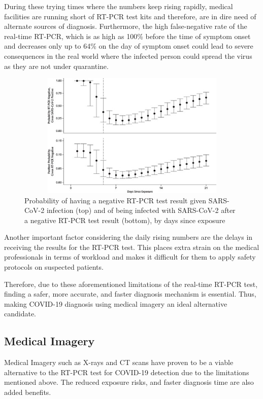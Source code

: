 During these trying times where the numbers keep rising rapidly, medical 
facilities are running short of RT-PCR test kits and therefore, are 
in dire need of alternate sources of diagnosis. Furthermore, 
the high false-negative rate of the real-time RT-PCR, 
which is as high as 100\% before the time of symptom onset 
and decreases only up to 64\% on the day of symptom onset \cite{KLL+2020} could 
lead to severe consequences in the real world where the 
infected person could spread the virus as they are not under quarantine.
\vspace{1em}
\begin{figure}[H]
    \centering
    \includegraphics[width=15cm, height=6cm]{Images/RTPCR.jpg}
    \decoRule
    \caption[RT-PCR Test Negative Rate]{Probability of having a negative RT-PCR test result given SARS-CoV-2 infection (top) and of being infected with SARS-CoV-2 after a negative RT-PCR test result (bottom), by days since exposure \cite{KLL+2020}}
    \label{fig:RT-PCR Test Negative Rate}
    \end{figure}
\vspace{-1em}
Another important factor considering the daily rising numbers are the delays in receiving the results for the RT-PCR test. This places extra strain on the medical professionals in terms of workload and makes it difficult for them to apply safety protocols on suspected patients.

Therefore, due to these aforementioned limitations of the real-time RT-PCR test, finding a safer, more accurate, and faster diagnosis mechanism is essential. Thus, making COVID-19 diagnosis using medical imagery an ideal alternative candidate.

\subsection{Medical Imagery} \label{medical imagery}
Medical Imagery such as X-rays and CT scans have proven to be a viable 
alternative to the RT-PCR test for COVID-19 detection 
due to the limitations mentioned above. The reduced exposure risks, and faster 
diagnosis time are also added benefits.

